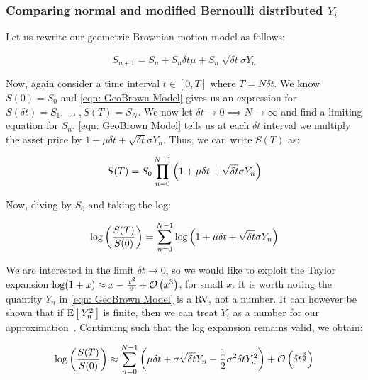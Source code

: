 \subsubsection{Comparing normal and modified Bernoulli distributed \(Y_i\)}

Let us rewrite our geometric Brownian motion model as follows:

\begin{equation}\label{eqn: GeoBrown Model}
    S_{n+1} = S_n + S_n\delta t\mu + S_n\sqrt[]{\delta t}\sigma Y_{n}
\end{equation}

Now, again consider a time interval \(t\in[0,T] \) where \(T = N\delta t\). We know \(S(0) = S_0 \) and \autoref{eqn: GeoBrown Model} gives us an expression for \(S(\delta t)=S_1,\;\dots \;,S(T) = S_N\). We now let \(\delta t \rightarrow 0 \implies N \rightarrow \infty \) and find a limiting equation for \( S_n \). \autoref{eqn: GeoBrown Model} tells us at each \(\delta t\) interval we multiply the asset price by \(1+\mu\delta t+\sqrt{\delta t}\sigma Y_n\). Thus, we can write \(S(T) \) as:

\begin{equation*}
    S(T) = S_0\prod_{n=0}^{N-1}\left(1+\mu\delta t+\sqrt{\delta t}\sigma Y_n\right)
\end{equation*}

Now, diving by \(S_0 \) and taking the log:

\begin{equation}\label{}
    \log\left(\frac{S(T)}{S(0)}\right) = \sum_{n=0}^{N-1}\log\left(1+\mu\delta t+\sqrt{\delta t}\sigma Y_n\right)
\end{equation}

We are interested in the limit \(\delta t \rightarrow 0\), so we would like to exploit the Taylor expansion \(\log(1 + x) \approx x - \frac{x^2}{2} + \mathcal{O}\left(x^3\right) \), for small \(x\). It is worth noting the quantity \(Y_n\) in \autoref{eqn: GeoBrown Model} is a RV, not a number. It can however be shown that if \(\text{E}\left[\,Y_n^2\,\right]\) is finite, then we can treat \(Y_i\) as a number for our approximation~\cite{higham2004introduction}. Continuing such that the log expansion remains valid, we obtain:

\begin{align}\label{eqn: GeoBrownExpansion}
    \log\left(\frac{S(T)}{S(0)}\right) \approx \sum_{n=0}^{N-1} \left(\mu\delta t + \sigma\sqrt{\delta t}Y_n - \frac{1}{2}\sigma^2\delta tY_n^2\right) + \mathcal{O}\left(\delta t^\frac{3}{2}\right)
\end{align}

